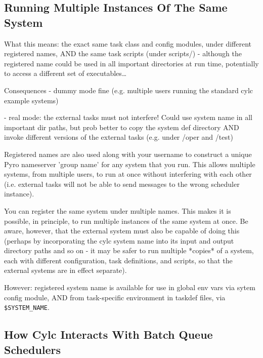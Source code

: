 \documentclass[11pt,a4paper]{article}
\begin{document}
\subsection{Running Multiple Instances Of The Same System}
\label{RunningMultipleInstancesOfTheSameSystem}

What this means: the exact same task class and config modules, under
different registered names, AND the same task scripts (under scripts/)
- although the registered name could be used in all important
directories at run time, potentially to access a different set of 
executables\dots

Consequences - dummy mode fine (e.g. multiple users running the standard
cylc example systems)

             - real mode: the external tasks must not interfere! Could
             use system name in all important dir paths, but prob better 
             to copy the system def directory AND invoke different versions
             of the external tasks (e.g. under /oper and /test)

    Registered names are also used along with your username to construct
    a unique Pyro nameserver 'group name' for any system that you run.
    This allows multiple systems, from multiple users, to run at once
    without interfering with each other (i.e. external tasks will not
    be able to send messages to the wrong scheduler instance).
    
    You can register the same system under multiple names. This makes it
    is possible, in principle, to run multiple instances of the same
    system at once. Be aware, however, that the external system must
    also be capable of doing this (perhaps by incorporating the cylc
    system name into its input and output directory paths and so on - it
    may be safer to run multiple *copies* of a system, each with
    different configuration, task definitions, and scripts, so that the
    external systems are in effect separate).

    However: registered system name is available for use in global 
    env vars via sytem config module, AND from task-specific 
    environment in taskdef files, via \lstinline=$SYSTEM_NAME=.

\subsection{How Cylc Interacts With Batch Queue Schedulers}
\label{HowCylcInteractsWithBatchQueueSchedulers}
\end{document}
